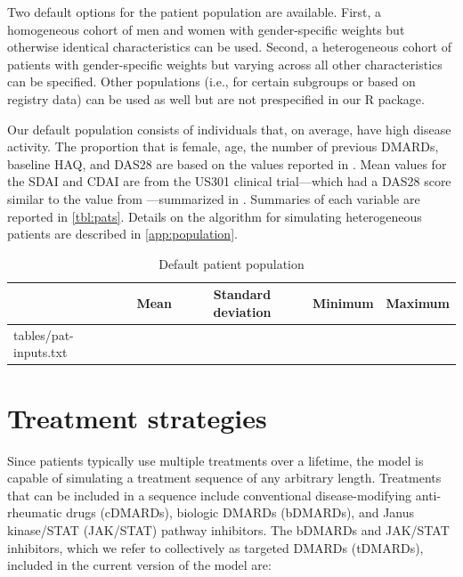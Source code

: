 \documentclass[11pt,final,fleqn]{article}
\makeatletter
\theoremstyle{plain}
\newcommand*\ExpandableInput[1]{\@@input#1 }
\newcommand\R{{\textsf{R}}}
\makeatother
\begin{document}
Two default options for the patient population are available. First, a homogeneous cohort of men and women with gender-specific weights but otherwise identical characteristics can be used. Second, a heterogeneous cohort of patients with gender-specific weights but varying across all other characteristics can be specified. Other populations (i.e., for certain subgroups or based on registry data) can be used as well but are not prespecified in our \R{} package. 


Our default population consists of individuals that, on average, have high disease activity. The proportion that is female, age, the number of previous DMARDs, baseline HAQ, and DAS28 are based on the values reported in \citet{curtis2010comparison}. Mean values for the SDAI and CDAI are from the US301 clinical trial---which had a DAS28 score similar to the value from \citet{curtis2010comparison}---summarized in \citet{smolen2003simplified}. Summaries of each variable are reported in \autoref{tbl:pats}. Details on the algorithm for simulating heterogeneous patients are described in \autoref{app:population}.

\begin{table}[!ht]
\begin{center}
\begin{threeparttable}
\caption{Default patient population} \label{tbl:pats}
\begin{tabularx}{\textwidth}{@{\extracolsep{\fill}}lcccc}
\hline
\multicolumn{1}{l}{} & \multicolumn{1}{c}{Mean} & \multicolumn{1}{c}{Standard deviation} & \multicolumn{1}{c}{Minimum} & \multicolumn{1}{c}{Maximum}\\
\hline
\ExpandableInput{tables/pat-inputs.txt}
\hline
\end{tabularx}
\scriptsize
\end{threeparttable}
\end{center}
\end{table}

\section{Treatment strategies}\label{sec:treatments}
Since patients typically use multiple treatments over a lifetime, the model is capable of simulating a treatment sequence of any arbitrary length. Treatments that can be included in a sequence include conventional disease-modifying anti-rheumatic drugs (cDMARDs), biologic DMARDs (bDMARDs), and Janus kinase/STAT (JAK/STAT) pathway inhibitors. The bDMARDs and JAK/STAT inhibitors, which we refer to collectively as targeted DMARDs (tDMARDs), included in the current version of the model are:
\end{document}
